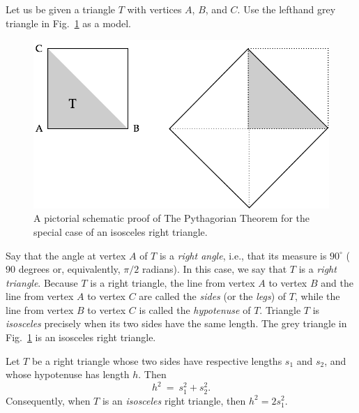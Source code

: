 Let us be given a triangle $T$ with vertices $A$, $B$, and $C$.
 Use the lefthand grey triangle in
Fig.~\ref{fig:unitsquare} as a model.
\begin{figure}[htb]
\begin{center}
       \includegraphics[scale=0.35]{FiguresArithmetic/UnitSquareSQRT2}
\caption{A pictorial schematic proof of The Pythagorian Theorem for
  the special case of an isosceles right triangle.
\label{fig:unitsquare}}
\end{center}
\end{figure}
%
%
Say that the angle at vertex $A$ of $T$ is a {\em right angle},
 i.e., that its measure is $90^\circ$    ($90$ degrees or, equivalently, $\pi/2$
radians).  In this case, we say that $T$ is a {\em right
  triangle}.  Because $T$ is a right
triangle, the line from vertex $A$ to vertex $B$ and the line from
vertex $A$ to vertex $C$ are called the {\em sides}
  (or the {\it legs}) of $T$, while the line from vertex
$B$ to vertex $C$ is called the {\em hypotenuse}  of $T$.  Triangle $T$ is {\em isosceles}
 precisely when its two sides have
the same length.  The grey triangle in Fig.~\ref{fig:unitsquare} is an
isosceles right triangle.

\begin{theorem}
\label{thm:Pythagorean-thm}
Let $T$ be a right triangle whose two sides have respective lengths
$s_1$ and $s_2$, and whose hypotenuse has length $h$.  Then
\[ h^2 \ = \ s_1^2 + s_2^2. \]
Consequently, when $T$ is an {\em isosceles} right triangle, then $h^2
= 2 s_1^2$.
\end{theorem}


